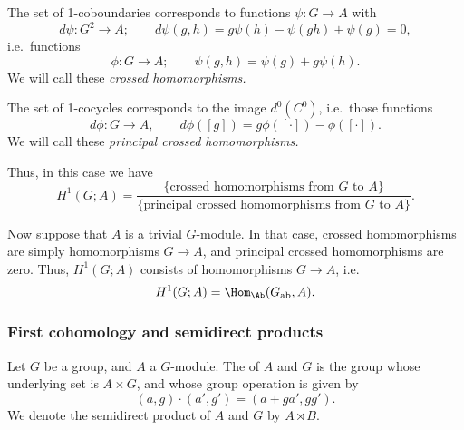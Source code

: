 \documentclass[main.tex]{subfiles}
\begin{document}
The set of 1-coboundaries corresponds to functions $\psi\colon G \to A$ with
\begin{equation*}
  d\psi\colon G^{2} \to A;\qquad d\psi(g,h) = g\psi(h) - \psi(gh) + \psi(g) = 0,
\end{equation*}
i.e.\ functions
\begin{equation*}
  \phi\colon G \to A;\qquad \psi(g, h) = \psi(g) + g\psi(h).
\end{equation*}
We will call these \emph{crossed homomorphisms.}

The set of 1-cocycles corresponds to the image $d^{0}(C^{0})$, i.e.\ those functions
\begin{equation*}
  d\phi\colon G \to A,\qquad d\phi([g]) = g\phi([\cdot]) - \phi([\cdot]).
\end{equation*}
We will call these \emph{principal crossed homomorphisms.}

Thus, in this case we have
\begin{equation*}
  H^{1}(G; A) = \frac{\{\text{crossed homomorphisms from $G$ to $A$}\}}{\{\text{principal crossed homomorphisms from $G$ to $A$}\}}.
\end{equation*}

Now suppose that $A$ is a trivial $G$-module. In that case, crossed homomorphisms are simply homomorphisms $G \to A$, and principal crossed homomorphisms are zero. Thus, $H^{1}(G; A)$ consists of homomorphisms $G \to A$, i.e.\
\begin{equation*}
  H^{1}(G; A) = \Hom_{\Ab}(G_{\mathrm{ab}}, A).
\end{equation*}

\subsubsection{First cohomology and semidirect products}
\label{sss:first_cohomology_and_semidirect_products}

\begin{definition}
  \label{def:semidirect_product}
  Let $G$ be a group, and $A$ a $G$-module. The  of $A$ and $G$ is the group whose underlying set is $A \times G$, and whose group operation is given by
  \begin{equation*}
    (a, g) \cdot (a', g') = (a + g a', gg').
  \end{equation*}
  We denote the semidirect product of $A$ and $G$ by $A \rtimes B$.
\end{definition}
\end{document}
